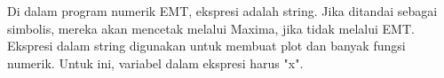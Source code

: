 \documentclass{article}
\begin{document}
\begin{eulernotebook}
\begin{eulercomment}
\begin{eulercomment}
\begin{eulercomment}
\begin{eulercomment}
\begin{eulercomment}
Di dalam program numerik EMT, ekspresi adalah string. Jika ditandai
sebagai simbolis, mereka akan mencetak melalui Maxima, jika tidak
melalui EMT. Ekspresi dalam string digunakan untuk membuat plot dan
banyak fungsi numerik. Untuk ini, variabel dalam ekspresi harus "x".


\end{eulercomment}
\end{eulercomment}
\end{eulercomment}
\end{eulercomment}
\end{eulercomment}
\end{eulernotebook}
\end{document}
